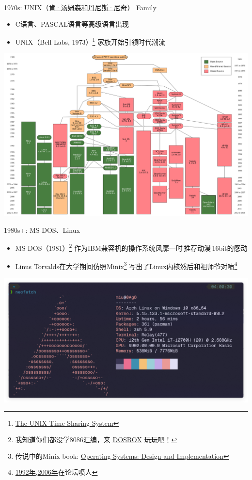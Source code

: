 \documentclass[aspectratio=1610]{beamer}
\begin{document}
\begin{frame}{1970s: UNIX（\href{https://en.wikipedia.org/wiki/Ken_Thompson}{\alert{肯·汤姆森和丹尼斯·尼奇}}） Family}
    \begin{itemize}
        \item C语言、PASCAL语言等高级语言出现
        \item \alert{UNIX}（Bell Labs, 1973）\footnote{\href{https://dl.acm.org/doi/pdf/10.1145/361011.361061}{The UNIX Time-Sharing System}} 家族开始引领时代潮流
    \end{itemize}
    \begin{minipage}{\textwidth}
        \centering
        \includegraphics[height=0.43\textwidth]{pic/unix_branch.png}
    \end{minipage}
\end{frame}

\begin{frame}{1980s+: MS-DOS、Linux}
    \begin{itemize}
        \item MS-DOS（1981）\footnote{我知道你们都没学8086汇编，来 \href{https://www.dosbox.com/}{DOSBOX} 玩玩吧！} 作为IBM兼容机的操作系统风靡一时\,推荐动漫\,16bit的感动
        \item Linus Torvalds在大学期间仿照Minix\footnote{传说中的Minix book: \href{https://dl.acm.org/doi/book/10.5555/1076555}{Operating Systems: Design and Implementation}} 写出了Linux内核\enspace 然后和祖师爷对喷\footnote{\href{https://groups.google.com/g/comp.os.minix/c/wlhw16QWltI}{1992年},\enspace\href{https://www.realworldtech.com/forum/?threadid=65915&curpostid=65936}{2006年}在论坛喷人}
    \end{itemize}
    \begin{minipage}{\textwidth}
        \centering
        \includegraphics[height=0.35\textwidth]{pic/ArchLinux.png}
    \end{minipage}
\end{frame}
\end{document}
